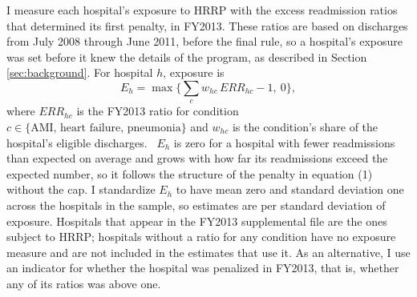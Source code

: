 \documentclass[12pt]{article}
\theoremstyle{definition}   %
\begin{document}
    I measure each hospital's exposure to HRRP with the excess readmission ratios that determined its first penalty, in FY2013. These ratios are based on discharges from July 2008 through June 2011, before the final rule, so a hospital's exposure was set before it knew the details of the program, as described in Section \ref{sec:background}. For hospital $h$, exposure is
        \begin{equation}
            E_{h} = \max\Big\{ \sum_{c} w_{hc}\, ERR_{hc} - 1,\ 0 \Big\},
        \end{equation}
    where $ERR_{hc}$ is the FY2013 ratio for condition $c \in \{\text{AMI, heart failure, pneumonia}\}$ and $w_{hc}$ is the condition's share of the hospital's eligible discharges.%
    \ $E_h$ is zero for a hospital with fewer readmissions than expected on average and grows with how far its readmissions exceed the expected number, so it follows the structure of the penalty in equation (1) without the cap. I standardize $E_h$ to have mean zero and standard deviation one across the hospitals in the sample, so estimates are per standard deviation of exposure. Hospitals that appear in the FY2013 supplemental file are the ones subject to HRRP; hospitals without a ratio for any condition have no exposure measure and are not included in the estimates that use it. As an alternative, I use an indicator for whether the hospital was penalized in FY2013, that is, whether any of its ratios was above one.
\end{document}
